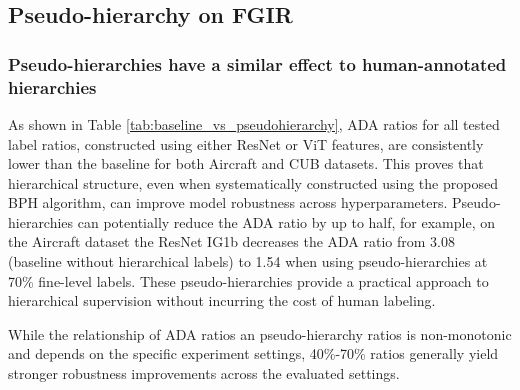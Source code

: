 \documentclass[conference]{IEEEtran}
\begin{document}
\subsection{Pseudo-hierarchy on FGIR}
\subsubsection{Pseudo-hierarchies have a similar effect to human-annotated hierarchies}
As shown in Table \ref{tab:baseline_vs_pseudohierarchy}, ADA ratios for all tested label ratios, constructed using either ResNet or ViT features, are consistently lower than the baseline for both Aircraft and CUB datasets. This proves that hierarchical structure, even when systematically constructed using the proposed BPH algorithm, can improve model robustness across hyperparameters. Pseudo-hierarchies can potentially reduce the ADA ratio by up to half, for example, on the Aircraft dataset the ResNet IG1b decreases the ADA ratio from 3.08 (baseline without hierarchical labels) to 1.54 when using pseudo-hierarchies at 70\% fine-level labels. These pseudo-hierarchies provide a practical approach to hierarchical supervision without incurring the cost of human labeling.

While the relationship of ADA ratios an pseudo-hierarchy ratios is non-monotonic and depends on the specific experiment settings, 40\%-70\% ratios generally yield stronger robustness improvements across the evaluated settings.

\end{document}
